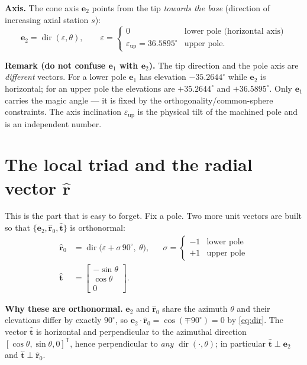 \documentclass[12pt]{article}
\newcommand{\ehat}[1]{\mathbf{e}_{#1}}
\newcommand{\rhat}{\hat{\mathbf{r}}}
\newcommand{\that}{\hat{\mathbf{t}}}
\newcommand{\dir}{\operatorname{dir}}
\begin{document}
\textbf{Axis.} The cone axis $\ehat{2}$ points from the tip \emph{towards the base}
(direction of increasing axial station $s$):
\begin{equation}
\ehat{2}=\dir(\varepsilon,\theta),\qquad
\varepsilon=\begin{cases}
0 & \text{lower pole (horizontal axis)}\\
\varepsilon_{\mathrm{up}}=36.5895^\circ & \text{upper pole}.
\end{cases}
\label{eq:axis}
\end{equation}

\textbf{Remark (do not confuse $\ehat{1}$ with $\ehat{2}$).} The tip direction and the
pole axis are \emph{different} vectors. For a lower pole $\ehat{1}$ has elevation
$-35.2644^\circ$ while $\ehat{2}$ is horizontal; for an upper pole the elevations are
$+35.2644^\circ$ and $+36.5895^\circ$. Only $\ehat{1}$ carries the magic angle --- it is
fixed by the orthogonality/common-sphere constraints. The axis inclination
$\varepsilon_{\mathrm{up}}$ is the physical tilt of the machined pole and is an
independent number.

\section{The local triad and the radial vector \boldmath$\rhat$}

This is the part that is easy to forget. Fix a pole. Two more unit vectors are built
so that $\{\ehat{2},\rhat_0,\that\}$ is orthonormal:
\begin{align}
\rhat_0 &= \dir\!\big(\varepsilon+\sigma\,90^\circ,\ \theta\big),
  &&\sigma=\begin{cases}-1 & \text{lower pole}\\ +1 & \text{upper pole}\end{cases}
  \label{eq:rad0}\\[2pt]
\that &= \begin{bmatrix}-\sin\theta\\ \cos\theta\\ 0\end{bmatrix}.
  \label{eq:tanv}
\end{align}

\textbf{Why these are orthonormal.} $\ehat{2}$ and $\rhat_0$ share the azimuth
$\theta$ and their elevations differ by exactly $90^\circ$, so
$\ehat{2}\cdot\rhat_0=\cos(\mp90^\circ)=0$ by \eqref{eq:dir}. The vector $\that$ is
horizontal and perpendicular to the azimuthal direction
$[\cos\theta,\sin\theta,0]^{\mathsf T}$, hence perpendicular to \emph{any}
$\dir(\cdot,\theta)$; in particular $\that\perp\ehat{2}$ and $\that\perp\rhat_0$.
\end{document}
